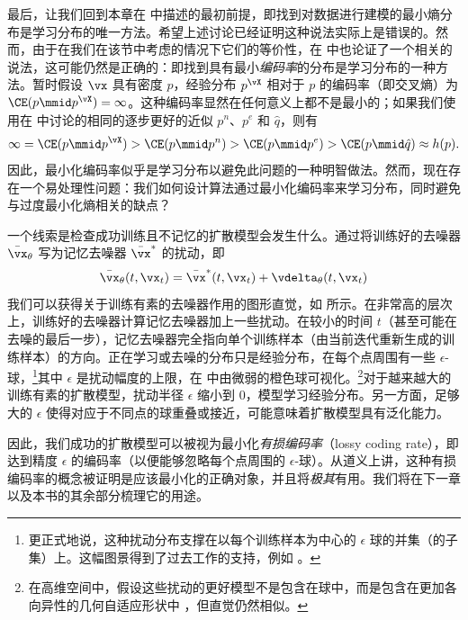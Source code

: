 \documentclass[../../book-main_zh.tex]{subfiles}
\begin{document}
最后，让我们回到本章在  中描述的最初前提，即找到对数据进行建模的最小熵分布是学习分布的唯一方法。希望上述讨论已经证明这种说法实际上是错误的。然而，由于在我们在该节中考虑的情况下它们的等价性，在  中也论证了一个相关的说法，这可能仍然是正确的：即找到具有最小\textit{编码率}的分布是学习分布的一种方法。暂时假设 \(\vx\) 具有密度 \(p\)，经验分布 \(p^{\vX}\) 相对于 \(p\) 的编码率（即交叉熵）为 \(\CE(p \mmid p^{\vX}) = \infty\)。这种编码率显然在任何意义上都不是最小的；如果我们使用在  中讨论的相同的逐步更好的近似 \(p^{n}\)、\(p^{e}\) 和 \(\hat{q}\)，则有
\begin{equation}
    \infty = \CE(p \mmid p^{\vX}) > \CE(p \mmid p^{n}) > \CE(p \mmid
    p^{e}) > \CE(p \mmid \hat{q}) \approx h(p).
\end{equation}
因此，最小化编码率似乎是学习分布以避免此问题的一种明智做法。然而，现在存在一个易处理性问题：我们如何设计算法通过最小化编码率来学习分布，同时避免与过度最小化熵相关的缺点？

一个线索是检查成功训练且不记忆的扩散模型会发生什么。通过将训练好的去噪器 \(\bar{\vx}_{\theta}\) 写为记忆去噪器 \(\bar{\vx}^{\ast}\) 的扰动，即
\begin{equation}
    \bar{\vx}_{\theta}(t, \vx_{t}) = \bar{\vx}^{\ast}(t, \vx_{t}) +
    \vdelta_{\theta}(t, \vx_{t})
\end{equation}
我们可以获得关于训练有素的去噪器作用的图形直觉，如  所示。在非常高的层次上，训练好的去噪器计算记忆去噪器加上一些扰动。在较小的时间 \(t\)（甚至可能在去噪的最后一步），记忆去噪器完全指向单个训练样本（由当前迭代重新生成的训练样本）的方向。正在学习或去噪的分布只是经验分布，在每个点周围有一些 \(\epsilon\)-球，\footnote{更正式地说，这种扰动分布支撑在以每个训练样本为中心的 \(\epsilon\) 球的并集（的子集）上。这幅图景得到了过去工作的支持，例如 \cite{song2025selective}。}其中 \(\epsilon\) 是扰动幅度的上限，在  中由微弱的橙色球可视化。\footnote{在高维空间中，假设这些扰动的更好模型不是包含在球中，而是包含在更加各向异性的几何自适应形状中 \cite{farghly2025diffusion}，但直觉仍然相似。}对于越来越大的训练有素的扩散模型，扰动半径 \(\epsilon\) 缩小到 \(0\)，模型学习经验分布。另一方面，足够大的 \(\epsilon\) 使得对应于不同点的球重叠或接近，可能意味着扩散模型具有泛化能力。

因此，我们成功的扩散模型可以被视为最小化\textit{有损编码率}（lossy coding rate），即达到精度 \(\epsilon\) 的编码率（以便能够忽略每个点周围的 \(\epsilon\)-球）。从道义上讲，这种有损编码率的概念被证明是应该最小化的正确对象，并且将\textit{极其}有用。我们将在下一章  以及本书的其余部分梳理它的用途。
\end{document}
